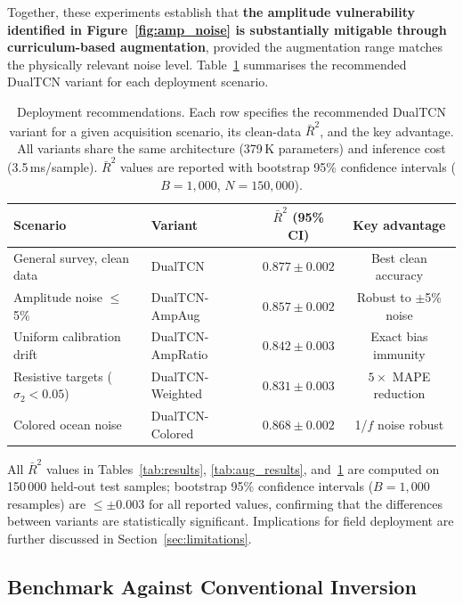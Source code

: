 \documentclass[journal]{IEEEtran}
\begin{document}
Together, these experiments establish that \textbf{the amplitude
vulnerability identified in Figure~\ref{fig:amp_noise} is
substantially mitigable through curriculum-based augmentation},
provided the augmentation range matches the physically relevant noise
level.  Table~\ref{tab:deployment} summarises the recommended DualTCN
variant for each deployment scenario.

\begin{table}[t]
  \centering
  \caption{Deployment recommendations.  Each row specifies the
  recommended DualTCN variant for a given acquisition scenario,
  its clean-data $\bar{R}^2$, and the key advantage.  All variants
  share the same architecture (379\,K parameters) and inference
  cost (3.5\,ms/sample).  $\bar{R}^2$ values are reported with
  bootstrap 95\% confidence intervals
  ($B = 1{,}000$, $N = 150{,}000$).}
  \label{tab:deployment}
  \footnotesize
  \setlength{\tabcolsep}{2pt}
  \begin{tabular}{p{2.2cm}lcc}
    \toprule
    Scenario & Variant & $\bar{R}^2$ (95\% CI) & Key advantage \\
    \midrule
    General survey, clean data
      & DualTCN
      & $0.877 \pm 0.002$
      & Best clean accuracy \\
    Amplitude noise $\leq$5\%
      & DualTCN-AmpAug
      & $0.857 \pm 0.002$
      & Robust to $\pm$5\% noise \\
    Uniform calibration drift
      & DualTCN-AmpRatio
      & $0.842 \pm 0.003$
      & Exact bias immunity \\
    Resistive targets ($\sigma_2 < 0.05$)
      & DualTCN-Weighted
      & $0.831 \pm 0.003$
      & $5\times$ MAPE reduction \\
    Colored ocean noise
      & DualTCN-Colored
      & $0.868 \pm 0.002$
      & 1/$f$ noise robust \\
    \bottomrule
  \end{tabular}
\end{table}

\noindent All $\bar{R}^2$ values in Tables~\ref{tab:results},
\ref{tab:aug_results}, and~\ref{tab:deployment} are computed on
150\,000 held-out test samples; bootstrap 95\% confidence intervals
($B = 1{,}000$ resamples) are $\leq \pm 0.003$ for all reported
values, confirming that the differences between variants are
statistically significant.
Implications for field deployment are further discussed in
Section~\ref{sec:limitations}.

\subsection{Benchmark Against Conventional Inversion}
\label{sec:benchmark}
\end{document}
